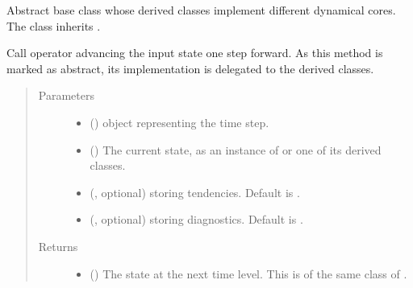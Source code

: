\documentclass[letterpaper,10pt,english]{sphinxmanual}
\begin{document}
\begin{fulllineitems}
\label{\detokenize{api:dycore.dycore.DynamicalCore}}
Abstract base class whose derived classes implement different dynamical cores.
The class inherits .

\begin{fulllineitems}
\label{\detokenize{api:dycore.dycore.DynamicalCore.__call__}}
Call operator advancing the input state one step forward.
As this method is marked as abstract, its implementation is delegated to the derived classes.
\begin{quote}\begin{description}
\item[{Parameters}] \leavevmode\begin{itemize}
\item {} 
 () \textendash{}  object representing the time step.

\item {} 
 () \textendash{} The current state, as an instance of {\hyperref[\detokenize{api:storages.grid_data.GridData}]{}} or one of its derived classes.

\item {} 
 (, optional) \textendash{} {\hyperref[\detokenize{api:storages.grid_data.GridData}]{}} storing tendencies. Default is .

\item {} 
 (, optional) \textendash{} {\hyperref[\detokenize{api:storages.grid_data.GridData}]{}} storing diagnostics. Default is .

\end{itemize}

\item[{Returns}] \leavevmode
\begin{itemize}
\item {} 
 () \textendash{} The state at the next time level. This is of the same class of .


\end{itemize}
\end{description}
\end{quote}
\end{fulllineitems}
\end{fulllineitems}
\end{document}
